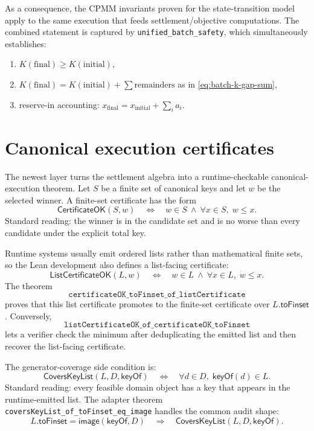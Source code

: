 \documentclass[11pt]{article}
\theoremstyle{remark}
\begin{document}
As a consequence, the CPMM invariants proven for the state-transition model apply to the
same execution that feeds settlement/objective computations. The combined statement is
captured by \texttt{unified\_batch\_safety}, which simultaneously establishes:
\begin{enumerate}[leftmargin=2em]
  \item $K(\mathrm{final}) \ge K(\mathrm{initial})$,
  \item $K(\mathrm{final}) = K(\mathrm{initial}) + \sum \text{remainders}$ as in \eqref{eq:batch-k-gap-sum},
  \item reserve-in accounting: $x_{\mathrm{final}} = x_{\mathrm{initial}} + \sum_i a_i$.
\end{enumerate}

\section{Canonical execution certificates}
\label{sec:canonical-execution}

The newest layer turns the settlement algebra into a runtime-checkable
canonical-execution theorem.  Let $S$ be a finite set of canonical keys and let
$w$ be the selected winner.  A finite-set certificate has the form
\[
  \mathsf{CertificateOK}(S,w)
  \quad\Longleftrightarrow\quad
  w\in S \ \land\ \forall x\in S,\; w\le x.
\]
Standard reading: the winner is in the candidate set and is no worse than every
candidate under the explicit total key.

Runtime systems usually emit ordered lists rather than mathematical finite sets,
so the Lean development also defines a list-facing certificate:
\[
  \mathsf{ListCertificateOK}(L,w)
  \quad\Longleftrightarrow\quad
  w\in L \ \land\ \forall x\in L,\; w\le x.
\]
The theorem
\[
  \texttt{certificateOK\_toFinset\_of\_listCertificate}
\]
proves that this list certificate promotes to the finite-set certificate over
$L.\mathsf{toFinset}$.  Conversely,
\[
  \texttt{listCertificateOK\_of\_certificateOK\_toFinset}
\]
lets a verifier check the minimum after deduplicating the emitted list and then
recover the list-facing certificate.

The generator-coverage side condition is:
\[
  \mathsf{CoversKeyList}(L,D,\mathsf{keyOf})
  \quad\Longleftrightarrow\quad
  \forall d\in D,\; \mathsf{keyOf}(d)\in L.
\]
Standard reading: every feasible domain object has a key that appears in the
runtime-emitted list.  The adapter theorem
\texttt{coversKeyList\_of\_toFinset\_eq\_image} handles the common audit shape:
\[
  L.\mathsf{toFinset} = \mathsf{image}(\mathsf{keyOf},D)
  \quad\Longrightarrow\quad
  \mathsf{CoversKeyList}(L,D,\mathsf{keyOf}).
\]
\end{document}
